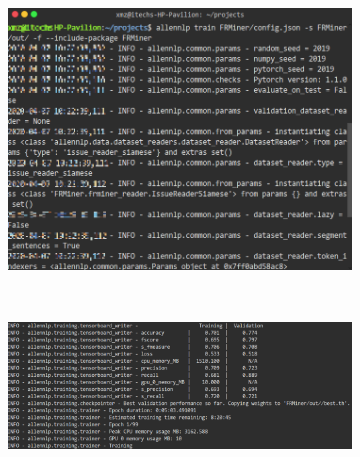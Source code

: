 \begin{figure}[htb]
    \centering
    \begin{subfigure}[b]{0.45\textwidth}
      \includegraphics[width=\textwidth]{Img/start.png}
      \caption{}
      \label{fig:start}
    \end{subfigure}%
    ~%
    \begin{subfigure}[b]{0.45\textwidth}
      \includegraphics[width=\textwidth]{Img/train.png}
      \caption{}
      \label{fig:train}
    \end{subfigure}
    ~%

    \label{fig:model-train}
\end{figure}

